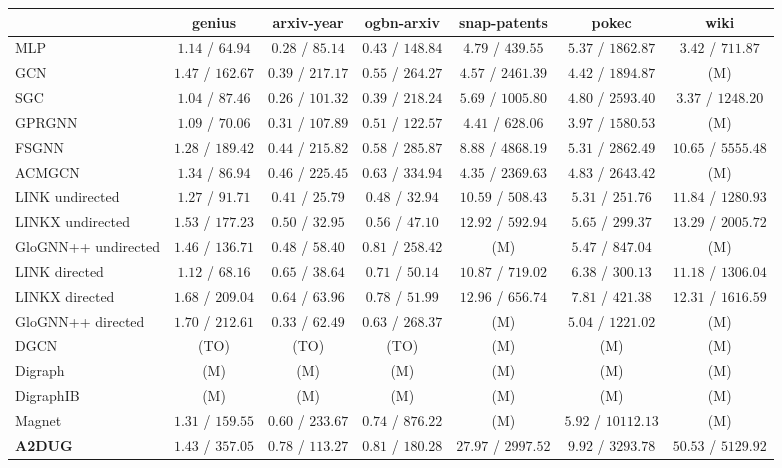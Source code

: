 \begin{table*}[t]
{\begin{tabular}{l|ccc|ccc}
{}&genius&arxiv-year&ogbn-arxiv&snap-patents&pokec&wiki\\
\midrule
MLP & $1.14$ / $64.94$ & $0.28$ / $85.14$ &$0.43$ / $148.84$ &$4.79$ / $439.55$ & $5.37$ / $1862.87$ &$3.42$ / $711.87$ \\\midrule
GCN &$1.47$ / $162.67$ &$0.39$ / $217.17$ &$0.55$ / $264.27$ & $4.57$ / $2461.39$ & $4.42$ / $1894.87$ &(M) \\
SGC & $1.04$ / $87.46$ &$0.26$ / $101.32$ &$0.39$ / $218.24$ & $5.69$ / $1005.80$ & $4.80$ / $2593.40$ & $3.37$ / $1248.20$ \\
GPRGNN& $1.09$ / $70.06$ &$0.31$ / $107.89$ &$0.51$ / $122.57$ &$4.41$ / $628.06$ & $3.97$ / $1580.53$ &(M) \\
FSGNN &$1.28$ / $189.42$ &$0.44$ / $215.82$ &$0.58$ / $285.87$ & $8.88$ / $4868.19$ & $5.31$ / $2862.49$ &$10.65$ / $5555.48$ \\
ACMGCN& $1.34$ / $86.94$ &$0.46$ / $225.45$ &$0.63$ / $334.94$ & $4.35$ / $2369.63$ & $4.83$ / $2643.42$ &(M) \\\midrule
LINK undirected & $1.27$ / $91.71$ & $0.41$ / $25.79$ &$0.48$ / $32.94$ & $10.59$ / $508.43$ &$5.31$ / $251.76$ &$11.84$ / $1280.93$ \\
LINKX undirected&$1.53$ / $177.23$ & $0.50$ / $32.95$ &$0.56$ / $47.10$ & $12.92$ / $592.94$ &$5.65$ / $299.37$ &$13.29$ / $2005.72$ \\
GloGNN++ undirected &$1.46$ / $136.71$ & $0.48$ / $58.40$ & $0.81$ / $258.42$ &(M) &$5.47$ / $847.04$ &(M) \\ \midrule
LINK directed & $1.12$ / $68.16$ & $0.65$ / $38.64$ &$0.71$ / $50.14$ & $10.87$ / $719.02$ &$6.38$ / $300.13$ &$11.18$ / $1306.04$ \\
LINKX directed&$1.68$ / $209.04$ & $0.64$ / $63.96$ &$0.78$ / $51.99$ & $12.96$ / $656.74$ &$7.81$ / $421.38$ &$12.31$ / $1616.59$ \\
GloGNN++ directed &$1.70$ / $212.61$ & $0.33$ / $62.49$ &$0.63$ / $268.37$ & (M) & $5.04$ / $1221.02$ &(M) \\ \midrule
DGCN& (TO) & (TO) &(TO) &(M) & (M) &(M)\\
Digraph & (M) & (M) &(M) & (M) & (M) &(M)\\
DigraphIB & (M) & (M) &(M) & (M) & (M) &(M)\\
Magnet&$1.31$ / $159.55$ &$0.60$ / $233.67$ &$0.74$ / $876.22$ &(M) &$5.92$ / $10112.13$ &(M) \\\midrule
\textbf{A2DUG} &$1.43$ / $357.05$ &$0.78$ / $113.27$ &$0.81$ / $180.28$ &$27.97$ / $2997.52$ & $9.92$ / $3293.78$ &$50.53$ / $5129.92$ \\

\bottomrule
\end{tabular}
}
\label{tb:efficiency}
\end{table*} 
